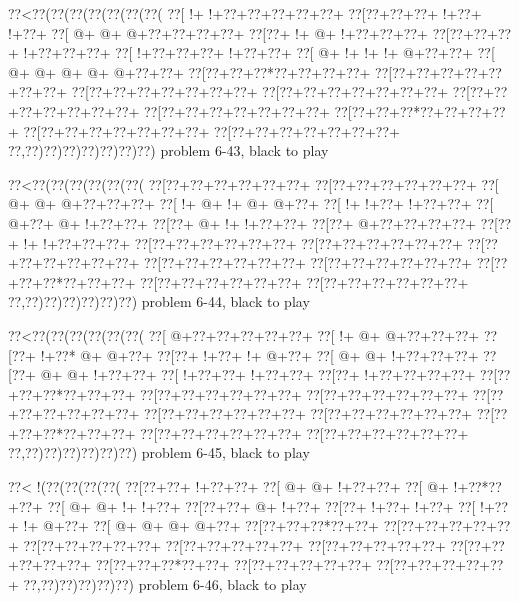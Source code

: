 \vbox{\vbox{\goo
\0??<\0??(\0??(\0??(\0??(\0??(\0??(\0??(
\0??[\- !+\- !+\0??+\0??+\0??+\0??+\0??+
\0??[\0??+\0??+\0??+\- !+\0??+\- !+\0??+
\0??[\- @+\- @+\- @+\0??+\0??+\0??+\0??+
\0??[\0??+\- !+\- @+\- !+\0??+\0??+\0??+
\0??[\0??+\0??+\0??+\- !+\0??+\0??+\0??+
\0??[\- !+\0??+\0??+\0??+\- !+\0??+\0??+
\0??[\- @+\- !+\- !+\- !+\- @+\0??+\0??+
\0??[\- @+\- @+\- @+\- @+\- @+\0??+\0??+
\0??[\0??+\0??+\0??*\0??+\0??+\0??+\0??+
\0??[\0??+\0??+\0??+\0??+\0??+\0??+\0??+
\0??[\0??+\0??+\0??+\0??+\0??+\0??+\0??+
\0??[\0??+\0??+\0??+\0??+\0??+\0??+\0??+
\0??[\0??+\0??+\0??+\0??+\0??+\0??+\0??+
\0??[\0??+\0??+\0??+\0??+\0??+\0??+\0??+
\0??[\0??+\0??+\0??*\0??+\0??+\0??+\0??+
\0??[\0??+\0??+\0??+\0??+\0??+\0??+\0??+
\0??[\0??+\0??+\0??+\0??+\0??+\0??+\0??+
\0??,\0??)\0??)\0??)\0??)\0??)\0??)\0??)
}
\hfil problem 6-43, black to play\hfil\break
}

\vbox{\vbox{\goo
\0??<\0??(\0??(\0??(\0??(\0??(\0??(
\0??[\0??+\0??+\0??+\0??+\0??+\0??+
\0??[\0??+\0??+\0??+\0??+\0??+\0??+
\0??[\- @+\- @+\- @+\0??+\0??+\0??+
\0??[\- !+\- @+\- !+\- @+\- @+\0??+
\0??[\- !+\- !+\0??+\- !+\0??+\0??+
\0??[\- @+\0??+\- @+\- !+\0??+\0??+
\0??[\0??+\- @+\- !+\- !+\0??+\0??+
\0??[\0??+\- @+\0??+\0??+\0??+\0??+
\0??[\0??+\- !+\- !+\0??+\0??+\0??+
\0??[\0??+\0??+\0??+\0??+\0??+\0??+
\0??[\0??+\0??+\0??+\0??+\0??+\0??+
\0??[\0??+\0??+\0??+\0??+\0??+\0??+
\0??[\0??+\0??+\0??+\0??+\0??+\0??+
\0??[\0??+\0??+\0??+\0??+\0??+\0??+
\0??[\0??+\0??+\0??*\0??+\0??+\0??+
\0??[\0??+\0??+\0??+\0??+\0??+\0??+
\0??[\0??+\0??+\0??+\0??+\0??+\0??+
\0??,\0??)\0??)\0??)\0??)\0??)\0??)
}
\hfil problem 6-44, black to play\hfil\break
}

\vbox{\vbox{\goo
\0??<\0??(\0??(\0??(\0??(\0??(\0??(
\0??[\- @+\0??+\0??+\0??+\0??+\0??+
\0??[\- !+\- @+\- @+\0??+\0??+\0??+
\0??[\0??+\- !+\0??*\- @+\- @+\0??+
\0??[\0??+\- !+\0??+\- !+\- @+\0??+
\0??[\- @+\- @+\- !+\0??+\0??+\0??+
\0??[\0??+\- @+\- @+\- !+\0??+\0??+
\0??[\- !+\0??+\0??+\- !+\0??+\0??+
\0??[\0??+\- !+\0??+\0??+\0??+\0??+
\0??[\0??+\0??+\0??*\0??+\0??+\0??+
\0??[\0??+\0??+\0??+\0??+\0??+\0??+
\0??[\0??+\0??+\0??+\0??+\0??+\0??+
\0??[\0??+\0??+\0??+\0??+\0??+\0??+
\0??[\0??+\0??+\0??+\0??+\0??+\0??+
\0??[\0??+\0??+\0??+\0??+\0??+\0??+
\0??[\0??+\0??+\0??*\0??+\0??+\0??+
\0??[\0??+\0??+\0??+\0??+\0??+\0??+
\0??[\0??+\0??+\0??+\0??+\0??+\0??+
\0??,\0??)\0??)\0??)\0??)\0??)\0??)
}
\hfil problem 6-45, black to play\hfil\break
}

\vbox{\vbox{\goo
\0??<\- !(\0??(\0??(\0??(\0??(
\0??[\0??+\0??+\- !+\0??+\0??+
\0??[\- @+\- @+\- !+\0??+\0??+
\0??[\- @+\- !+\0??*\0??+\0??+
\0??[\- @+\- @+\- !+\- !+\0??+
\0??[\0??+\0??+\- @+\- !+\0??+
\0??[\0??+\- !+\0??+\- !+\0??+
\0??[\- !+\0??+\- !+\- @+\0??+
\0??[\- @+\- @+\- @+\- @+\0??+
\0??[\0??+\0??+\0??*\0??+\0??+
\0??[\0??+\0??+\0??+\0??+\0??+
\0??[\0??+\0??+\0??+\0??+\0??+
\0??[\0??+\0??+\0??+\0??+\0??+
\0??[\0??+\0??+\0??+\0??+\0??+
\0??[\0??+\0??+\0??+\0??+\0??+
\0??[\0??+\0??+\0??*\0??+\0??+
\0??[\0??+\0??+\0??+\0??+\0??+
\0??[\0??+\0??+\0??+\0??+\0??+
\0??,\0??)\0??)\0??)\0??)\0??)
}
\hfil problem 6-46, black to play\hfil\break
}

